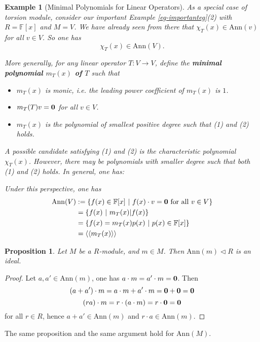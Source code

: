 \documentclass[12pt]{amsbook}
\newtheorem{example}[theorem]{Example}
\newtheorem{proposition}[theorem]{Proposition}
\begin{document}
\begin{example}[Minimal Polynomials for Linear Operators]
As a special case of torsion module, consider our important Example \ref{eg-importanteg}(2) with $R=\mathbb{F}[x]$ and $M=V$. We have already seen from there that
$\chi_T(x) \in \mathrm{Ann}(v)$ for all $v \in V$. So one has
$$\chi_T(x) \in \mathrm{Ann}(V).$$

More generally, for any linear operator $T:V \to V$, define the {\bf minimal polynomial $m_T(x)$ of $T$} such that
\begin{itemize}
    \item[(1)] $m_T(x)$ is monic, i.e. the leading power coefficient of $m_T(x)$ is $1$.
    \item[(2)] $m_T(T) v = {\bf 0}$ for all $v \in V$.
    \item[(3)] $m_T(x)$ is the polynomial of smallest positive degree such that (1) and (2) holds.
\end{itemize}

A possible candidate satisfying (1) and (2) is the characteristic polynomial $\chi_T(x)$. However, there may be polynomials with smaller degree such that both (1) and (2) holds. In general, one has:
\begin{center}
\end{center}
Under this perspective, one has
        \begin{align*}
            \mathrm{Ann}(V)&:=\{f(x) \in\mathbb{F}[x] \ |\ f(x)\cdot v = {\bf 0}\ \text{for all}\ v \in V \}\\
            &= \{ f(x)\ |\ m_T(x)| f(x)\}\\
            &= \{ f(x) = m_T(x)p(x) \ |\ p(x) \in \mathbb{F}[x]\}\\
            &=\langle\langle m_{T}(x)\rangle\rangle
        \end{align*}
\end{example}
    
\begin{proposition}
    Let $M$ be a $R$-module, and $m\in M$. Then $\mathrm{Ann}(m) \lhd R$ is an ideal.
\end{proposition}

\begin{proof}
    Let $a,a'\in \mathrm{Ann}(m)$, one has $a\cdot m=a'\cdot m={\bf 0}$. Then
    $$(a+a')\cdot m=a\cdot m+a'\cdot m={\bf 0}+{\bf 0}={\bf 0}$$
    $$(ra)\cdot m=r\cdot(a\cdot m)=r\cdot{\bf 0}={\bf 0}$$
    for all $r\in R$, hence $a+a'\in\mathrm{Ann}(m)$ and $r\cdot a\in\mathrm{Ann}(m)$.
\end{proof}
The same proposition and the same argument hold for $\mathrm{Ann}(M)$.
\end{document}
